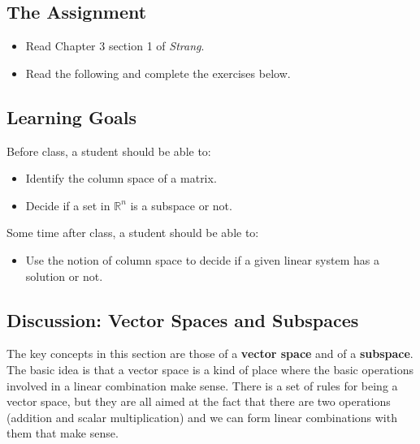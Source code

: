 \documentclass[10pt,]{book}
\newcommand{\terminology}[1]{\textbf{#1}}
\theoremstyle{plain}
\theoremstyle{definition}
\numberwithin{equation}{section}
\begin{document}
\subsection[The Assignment]{The Assignment}\label{subsection-58}
\begin{itemize}
\item{}Read Chapter 3 section 1 of \emph{Strang}.\item{}Read the following and complete the exercises below.\end{itemize}
\typeout{************************************************}
\typeout{************************************************}
\subsection[Learning Goals]{Learning Goals}\label{subsection-59}
Before class, a student should be able to:%
\begin{itemize}
\item{}Identify the column space of a matrix.\item{}Decide if a set in \(\mathbb{R}^n\) is a subspace or not.\end{itemize}
\par
Some time after class, a student should be able to:%
\begin{itemize}
\item{}
        Use the notion of column space to decide if a given linear system has a
        solution or not.
      \end{itemize}
\typeout{************************************************}
\typeout{************************************************}
\subsection[Discussion: Vector Spaces and Subspaces]{Discussion: Vector Spaces and Subspaces}\label{subsection-60}

      The key concepts in this section are those of a \terminology{vector space}
      and of a \terminology{subspace}. The basic idea is that a vector space is
      a kind of place where the basic operations involved in a linear
      combination make sense. There is a set of rules for being a vector space,
      but they are all aimed at the fact that there are two operations
      (addition and scalar multiplication) and we can form linear combinations
      with them that make sense.
\par
\end{document}
